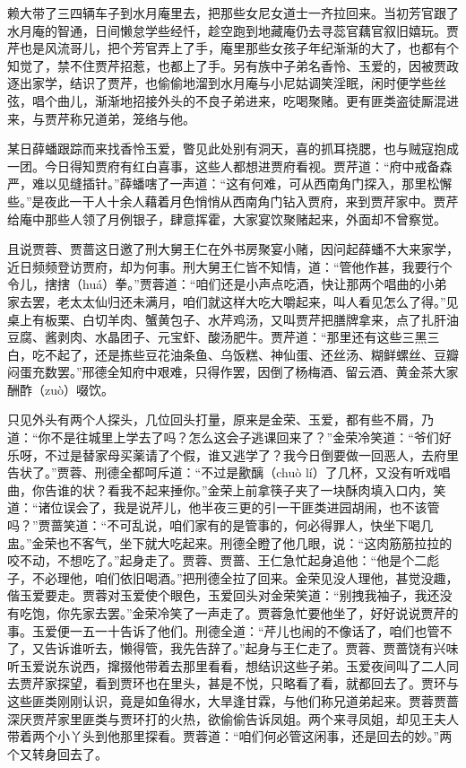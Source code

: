 \documentclass[12pt,oneside]{book}
\begin{document}
赖大带了三四辆车子到水月庵里去，把那些女尼女道士一齐拉回来。当初芳官跟了水月庵的智通，日间懒怠学些经忏，趁空跑到地藏庵仍去寻蕊官藕官叙旧嬉玩。贾芹也是风流哥儿，把个芳官弄上了手，庵里那些女孩子年纪渐渐的大了，也都有个知觉了，禁不住贾芹招惹，也都上了手。另有族中子弟名香怜、玉爱的，因被贾政逐出家学，结识了贾芹，也偷偷地溜到水月庵与小尼姑调笑淫眠，闲时便学些丝弦，唱个曲儿，渐渐地招接外头的不良子弟进来，吃喝聚赌。更有匪类盗徒厮混进来，与贾芹称兄道弟，笼络与他。

某日薛蟠跟踪而来找香怜玉爱，瞥见此处别有洞天，喜的抓耳挠腮，也与贼寇抱成一团。今日得知贾府有红白喜事，这些人都想进贾府看视。贾芹道：“府中戒备森严，难以见缝插针。”薛蟠嗐了一声道：“这有何难，可从西南角门探入，那里松懈些。”是夜此一干人十余人藉着月色悄悄从西南角门钻入贾府，来到贾芹家中。贾芹给庵中那些人领了月例银子，肆意挥霍，大家宴饮聚赌起来，外面却不曾察觉。

且说贾蓉、贾蔷这日邀了刑大舅王仁在外书房聚宴小赌，因问起薛蟠不大来家学，近日频频登访贾府，却为何事。刑大舅王仁皆不知情，道：“管他作甚，我要行个令儿，搳搳（huá）拳。”贾蓉道：“咱们还是小声点吃酒，快让那两个唱曲的小弟家去罢，老太太仙归还未满月，咱们就这样大吃大嚼起来，叫人看见怎么了得。”见桌上有板栗、白切羊肉、蟹黄包子、水芹鸡汤，又叫贾芹把膳牌拿来，点了扎肝油豆腐、酱剥肉、水晶团子、元宝虾、酸汤肥牛。贾芹道：“那里还有这些三黑三白，吃不起了，还是拣些豆花油条鱼、乌饭糕、神仙蛋、还丝汤、糊鲜螺丝、豆瓣闷蛋充数罢。”邢德全知府中艰难，只得作罢，因倒了杨梅酒、留云酒、黄金茶大家酬酢（zuò）啜饮。

只见外头有两个人探头，几位回头打量，原来是金荣、玉爱，都有些不屑，乃道：“你不是往城里上学去了吗？怎么这会子逃课回来了？”金荣冷笑道：“爷们好乐呀，不过是替家母买薬请了个假，谁又逃学了？我今日倒要做一回恶人，去府里告状了。”贾蓉、刑德全都呵斥道：“不过是歠醨（chuò lí）了几杯，又没有听戏唱曲，你告谁的状？看我不起来捶你。”金荣上前拿筷子夹了一块酥肉填入口内，笑道：“诸位误会了，我是说芹儿，他半夜三更的引一干匪类进园胡闹，也不该管吗？”贾蔷笑道：“不可乱说，咱们家有的是管事的，何必得罪人，快坐下喝几盅。”金荣也不客气，坐下就大吃起来。刑德全瞪了他几眼，说：“这肉筋筋拉拉的咬不动，不想吃了。”起身走了。贾蓉、贾蔷、王仁急忙起身追他：“他是个二彪子，不必理他，咱们依旧喝酒。”把刑德全拉了回来。金荣见没人理他，甚觉没趣，偕玉爱要走。贾蓉对玉爱使个眼色，玉爱回头对金荣笑道：“别拽我袖子，我还没有吃饱，你先家去罢。”金荣冷笑了一声走了。贾蓉急忙要他坐了，好好说说贾芹的事。玉爱便一五一十告诉了他们。刑德全道：“芹儿也闹的不像话了，咱们也管不了，又告诉谁听去，懒得管，我先告辞了。”起身与王仁走了。贾蓉、贾蔷饶有兴味听玉爱说东说西，撺掇他带着去那里看看，想结识这些子弟。玉爱夜间叫了二人同去贾芹家探望，看到贾环也在里头，甚是不悦，只略看了看，就都回去了。贾环与这些匪类刚刚认识，竟是如鱼得水，大旱逢甘霖，与他们称兄道弟起来。贾蓉贾蔷深厌贾芹家里匪类与贾环打的火热，欲偷偷告诉凤姐。两个来寻凤姐，却见王夫人带着两个小丫头到他那里探看。贾蓉道：“咱们何必管这闲事，还是回去的妙。”两个又转身回去了。
\end{document}
